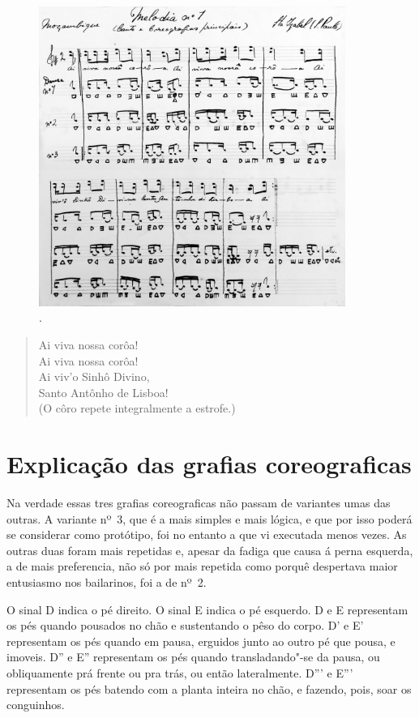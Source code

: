 \begin{figure}[!ht]
\centering
 \includegraphics[width=100mm]{./imgs/img3.jpg}
\caption{.}
\end{figure}

\begin{verse}
Ai viva nossa corôa!\\
Ai viva nossa corôa!\\
Ai viv'o Sinhô Divino,\\
Santo Antônho de Lisboa!\\[5pt]
(O côro repete integralmente a estrofe.)
\end{verse}

\section{Explicação das grafias coreograficas}

Na verdade essas tres grafias coreograficas não passam de variantes umas
das outras. A variante nº~3, que é a mais simples e mais lógica, e que
por isso poderá se considerar como protótipo, foi no entanto a que vi
executada menos vezes. As outras duas foram mais repetidas e, apesar da
fadiga que causa á perna esquerda, a de mais preferencia, não só por
mais repetida como porquê despertava maior entusiasmo nos bailarinos,
foi a de nº~2.

O sinal D indica o pé direito. O sinal E indica o pé esquerdo. D e E
representam os pés quando pousados no chão e sustentando o pêso do
corpo. D' e E' representam os pés quando em pausa, erguidos junto ao
outro pé que pousa, e imoveis. D'' e E'' representam os pés quando
transladando"-se da pausa, ou obliquamente prá frente ou pra trás, ou
então lateralmente. D''' e E''' representam os pés batendo com a planta
inteira no chão, e fazendo, pois, soar os conguinhos.

